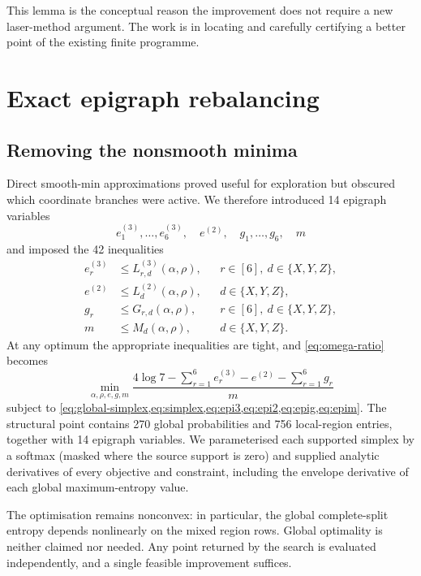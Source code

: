 \documentclass[11pt,reqno]{amsart}
\theoremstyle{definition}
\theoremstyle{remark}
\begin{document}
This lemma is the conceptual reason the improvement does not require a new laser-method argument.
The work is in locating and carefully certifying a better point of the existing finite programme.

\section{Exact epigraph rebalancing}

\subsection{Removing the nonsmooth minima}

Direct smooth-min approximations proved useful for exploration but obscured which coordinate branches
were active.  We therefore introduced 14 epigraph variables
\[
 e^{(3)}_1,\ldots,e^{(3)}_6,\quad e^{(2)},\quad
 g_1,\ldots,g_6,\quad m
\]
and imposed the 42 inequalities
\begin{align}
 e^{(3)}_r&\le L^{(3)}_{r,d}(\alpha,\rho), &&r\in[6],\ d\in\{X,Y,Z\},\label{eq:epi3}\\
 e^{(2)}&\le L^{(2)}_d(\alpha,\rho), &&d\in\{X,Y,Z\},\label{eq:epi2}\\
 g_r&\le G_{r,d}(\alpha,\rho), &&r\in[6],\ d\in\{X,Y,Z\},\label{eq:epig}\\
 m&\le M_d(\alpha,\rho), &&d\in\{X,Y,Z\}.\label{eq:epim}
\end{align}
At any optimum the appropriate inequalities are tight, and \cref{eq:omega-ratio} becomes
\begin{equation}\label{eq:epi-objective}
  \min_{\alpha,\rho,e,g,m}
  \frac{4\log 7-\sum_{r=1}^{6}e^{(3)}_r-e^{(2)}-\sum_{r=1}^{6}g_r}{m}
\end{equation}
subject to \cref{eq:global-simplex,eq:simplex,eq:epi3,eq:epi2,eq:epig,eq:epim}.  The structural point
contains 270 global probabilities and 756 local-region entries, together with 14 epigraph variables.
We parameterised each supported simplex by a softmax (masked where the source support is zero) and
supplied analytic derivatives of every objective and constraint, including the envelope derivative of
each global maximum-entropy value.

The optimisation remains nonconvex: in particular, the global complete-split entropy depends nonlinearly
on the mixed region rows.  Global optimality is neither claimed nor needed.  Any point returned by the
search is evaluated independently, and a single feasible improvement suffices.
\end{document}
